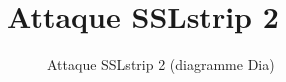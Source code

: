 \chapter{Attaque SSLstrip 2}

\label{sec:sslstrip2}

\begin{figure}[H]
  \caption{Attaque SSLstrip 2 (diagramme Dia)}
\end{figure}
